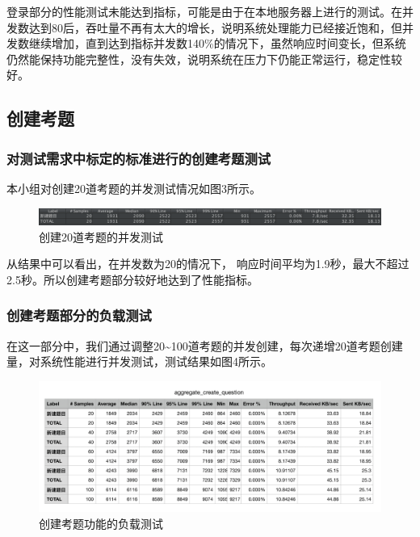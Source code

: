\documentclass[hyperref, a4paper]{ctexart}
\begin{document}
登录部分的性能测试未能达到指标，可能是由于在本地服务器上进行的测试。在并发数达到80后，吞吐量不再有太大的增长，说明系统处理能力已经接近饱和，但并发数继续增加，直到达到指标并发数140\%的情况下，虽然响应时间变长，但系统仍然能保持功能完整性，没有失效，说明系统在压力下仍能正常运行，稳定性较好。

\hypertarget{ux521bux5efaux8003ux9898}{%
\subsection{创建考题}\label{ux521bux5efaux8003ux9898}}

\hypertarget{ux5bf9ux6d4bux8bd5ux9700ux6c42ux4e2dux6807ux5b9aux7684ux6807ux51c6ux8fdbux884cux7684ux521bux5efaux8003ux9898ux6d4bux8bd5}{%
\subsubsection{对测试需求中标定的标准进行的创建考题测试}\label{ux5bf9ux6d4bux8bd5ux9700ux6c42ux4e2dux6807ux5b9aux7684ux6807ux51c6ux8fdbux884cux7684ux521bux5efaux8003ux9898ux6d4bux8bd5}}

本小组对创建20道考题的并发测试情况如图3所示。

\begin{figure}
\centering
\includegraphics{resources/wcn/create_question_20.png}
\caption{创建20道考题的并发测试}
\end{figure}

从结果中可以看出，在并发数为20的情况下，
响应时间平均为1.9秒，最大不超过2.5秒。所以创建考题部分较好地达到了性能指标。

\hypertarget{ux521bux5efaux8003ux9898ux90e8ux5206ux7684ux8d1fux8f7dux6d4bux8bd5}{%
\subsubsection{创建考题部分的负载测试}\label{ux521bux5efaux8003ux9898ux90e8ux5206ux7684ux8d1fux8f7dux6d4bux8bd5}}

在这一部分中，我们通过调整20\textasciitilde{}100道考题的并发创建，每次递增20道考题创建量，对系统性能进行并发测试，测试结果如图4所示。

\begin{figure}
\centering
\includegraphics{resources/wcn/create_question_aggregate.png}
\caption{创建考题功能的负载测试}
\end{figure}
\end{document}
